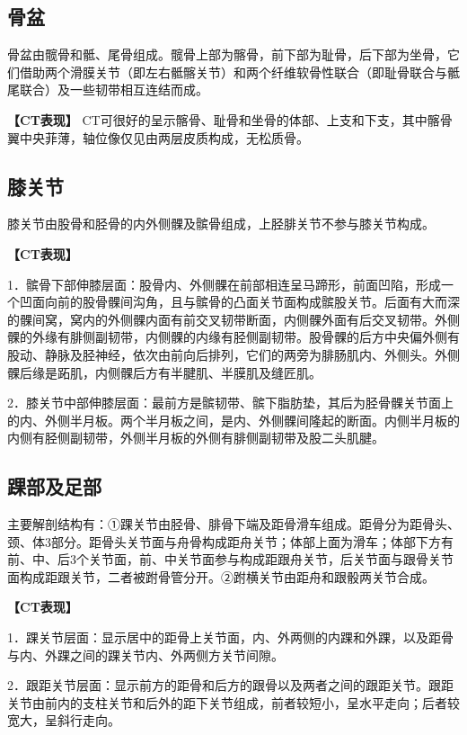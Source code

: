 \subsection{骨盆}

骨盆由髋骨和骶、尾骨组成。髋骨上部为髂骨，前下部为耻骨，后下部为坐骨，它们借助两个滑膜关节（即左右骶髂关节）和两个纤维软骨性联合（即耻骨联合与骶尾联合）及一些韧带相互连结而成。

\textbf{【CT表现】}
CT可很好的呈示髂骨、耻骨和坐骨的体部、上支和下支，其中髂骨翼中央菲薄，轴位像仅见由两层皮质构成，无松质骨。

\subsection{膝关节}

膝关节由股骨和胫骨的内外侧髁及髌骨组成，上胫腓关节不参与膝关节构成。

\textbf{【CT表现】}

1．髌骨下部伸膝层面：股骨内、外侧髁在前部相连呈马蹄形，前面凹陷，形成一个凹面向前的股骨髁间沟角，且与髌骨的凸面关节面构成髌股关节。后面有大而深的髁间窝，窝内的外侧髁内面有前交叉韧带断面，内侧髁外面有后交叉韧带。外侧髁的外缘有腓侧副韧带，内侧髁的内缘有胫侧副韧带。股骨髁的后方中央偏外侧有股动、静脉及胫神经，依次由前向后排列，它们的两旁为腓肠肌内、外侧头。外侧髁后缘是跖肌，内侧髁后方有半腱肌、半膜肌及缝匠肌。

2．膝关节中部伸膝层面：最前方是髌韧带、髌下脂肪垫，其后为胫骨髁关节面上的内、外侧半月板。两个半月板之间，是内、外侧髁间隆起的断面。内侧半月板的内侧有胫侧副韧带，外侧半月板的外侧有腓侧副韧带及股二头肌腱。

\subsection{踝部及足部}

主要解剖结构有：①踝关节由胫骨、腓骨下端及距骨滑车组成。距骨分为距骨头、颈、体3部分。距骨头关节面与舟骨构成距舟关节；体部上面为滑车；体部下方有前、中、后3个关节面，前、中关节面参与构成距跟舟关节，后关节面与跟骨关节面构成距跟关节，二者被跗骨管分开。②跗横关节由距舟和跟骰两关节合成。

\textbf{【CT表现】}

1．踝关节层面：显示居中的距骨上关节面，内、外两侧的内踝和外踝，以及距骨与内、外踝之间的踝关节内、外两侧方关节间隙。

2．跟距关节层面：显示前方的距骨和后方的跟骨以及两者之间的跟距关节。跟距关节由前内的支柱关节和后外的距下关节组成，前者较短小，呈水平走向；后者较宽大，呈斜行走向。

